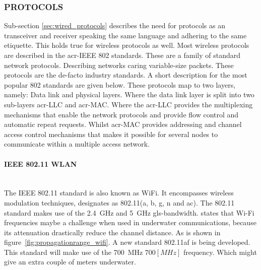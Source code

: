 \subsubsection{PROTOCOLS}
Sub-section \ref{sec:wired_protocols} describes the need for protocols as an transceiver and receiver speaking the same language and adhering to the same etiquette. This holds true for wireless protocols as well. Most wireless protocols are described in the \gls{acr-IEEE} 802 standards. These are a family of standard network protocols. Describing networks caring variable-size packets. These protocols are the de-facto industry standards. A short description for the most popular 802 standards are given below. These protocols map to two layers, namely: Data link and physical layers. Where the data link layer is split into two sub-layers \gls{acr-LLC} and \gls{acr-MAC}. Where the \gls{acr-LLC} provides the multiplexing mechanisms that enable the network protocols and provide flow control and automatic repeat requests. Whilst \gls{acr-MAC} provides addressing and channel access control mechanisms that makes it possible for several nodes to communicate within a multiple access network.

\paragraph{IEEE 802.11 WLAN} \hfil \\
The IEEE 802.11 standard is also known as WiFi. It encompasses wireless modulation techniques, designates as 802.11(a, b, g, n and ac). The 802.11 standard makes use of the \SI{2.4}{\giga\hertz} and \SI{5}{\giga\hertz} \gls{gls-bandwidth}. \citet{freitas_evaluation_2014} states that Wi-Fi frequencies maybe a challenge when used in underwater communications, because its attenuation drastically reduce the channel distance. As is shown in figure~\ref{fig:propagationrange_wifi}.
A new standard 802.11af is being developed. This standard will make use of the \SI{700}{\mega\hertz} $ 700 [MHz] $ frequency. Which might give an extra couple of meters underwater.

